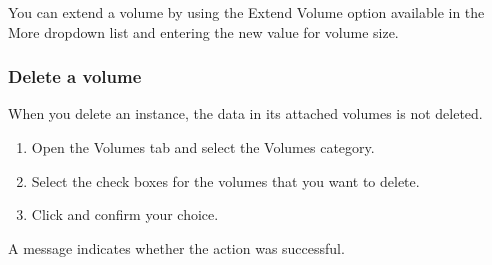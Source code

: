  You can extend a volume by using the Extend Volume
option available in the More dropdown list and entering the new value
for volume size.

\subsubsection{Delete a volume}\label{delete-a-volume}
When you delete an instance, the data in its attached volumes is not
deleted.

\begin{enumerate}
\item Open the Volumes tab and select the Volumes category.
\item Select the check boxes for the volumes that you want to delete.
\item Click  and confirm your choice.
\end{enumerate}

A message indicates whether the action was successful.

